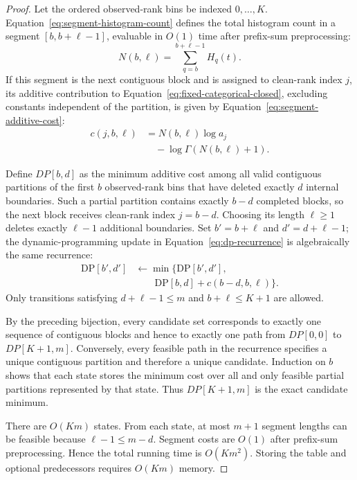 \begin{proof}
Let the ordered observed-rank bins be indexed \(0,\ldots,K\). Equation~\eqref{eq:segment-histogram-count} defines the total histogram count in a segment \([b,b+\ell-1]\), evaluable in \(O(1)\) time after prefix-sum preprocessing:
\begin{equation}
N(b,\ell)
  =
  \sum_{q=b}^{b+\ell-1}H_q(t).
  \label{eq:segment-histogram-count}
\end{equation}
If this segment is the next contiguous block and is assigned to clean-rank index \(j\), its additive contribution to Equation~\eqref{eq:fixed-categorical-closed}, excluding constants independent of the partition, is given by Equation~\eqref{eq:segment-additive-cost}:
\begin{equation}
\begin{aligned}
c(j,b,\ell)
&=N(b,\ell)\log a_j\\
&\quad-\log\Gamma(N(b,\ell)+1).
\end{aligned}
\label{eq:segment-additive-cost}
\end{equation}

Define \(DP[b,d]\) as the minimum additive cost among all valid contiguous partitions of the first \(b\) observed-rank bins that have deleted exactly \(d\) internal boundaries. Such a partial partition contains exactly \(b-d\) completed blocks, so the next block receives clean-rank index
\(j=b-d.\)
Choosing its length \(\ell\ge1\) deletes exactly \(\ell-1\) additional boundaries. Set \(b'=b+\ell\) and \(d'=d+\ell-1\); the dynamic-programming update in Equation~\eqref{eq:dp-recurrence} is algebraically the same recurrence:
\begin{equation}
\begin{aligned}
\mathrm{DP}[b',d'] &\gets
  \min\!\bigl\{\mathrm{DP}[b',d'],\\
&\qquad \mathrm{DP}[b,d]+c(b-d,b,\ell)\bigr\}.
\end{aligned}
\label{eq:dp-recurrence}
\end{equation}
Only transitions satisfying
\(d+\ell-1\le m\)
and \(b+\ell\le K+1\) are allowed.

By the preceding bijection, every candidate set corresponds to exactly one sequence of contiguous blocks and hence to exactly one path from \(DP[0,0]\) to \(DP[K+1,m]\). Conversely, every feasible path in the recurrence specifies a unique contiguous partition and therefore a unique candidate. Induction on \(b\) shows that each state stores the minimum cost over all and only feasible partial partitions represented by that state. Thus \(DP[K+1,m]\) is the exact candidate minimum.

There are \(O(Km)\) states. From each state, at most \(m+1\) segment lengths can be feasible because \(\ell-1\le m-d\). Segment costs are \(O(1)\) after prefix-sum preprocessing. Hence the total running time is \(O(Km^2)\). Storing the table and optional predecessors requires \(O(Km)\) memory.
\end{proof}

